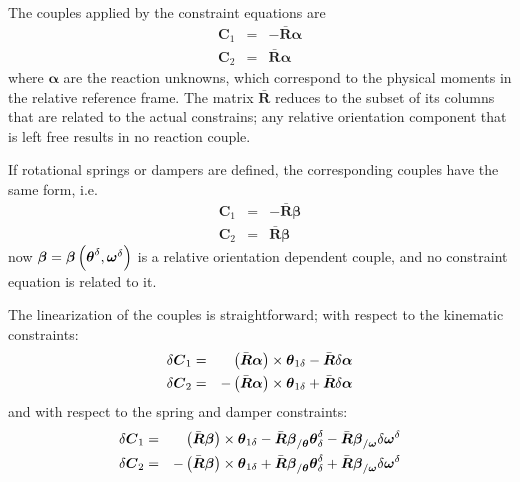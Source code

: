 \documentclass[10pt,dvips,fleqn]{report}
\newcommand{\T}[1]{\boldsymbol{#1}}
\begin{document}
\noindent
The couples applied by the constraint equations are
\begin{eqnarray*}
	\T{C}_1 & = & - \bar{\T{R}} \T{\alpha} \\
	\T{C}_2 & = & \bar{\T{R}} \T{\alpha}
\end{eqnarray*}
where $\T{\alpha}$ are the reaction unknowns, which correspond 
to the physical moments in the relative reference frame.
The matrix $\bar{\T{R}}$ reduces to the subset of its columns 
that are related to the actual constrains; any relative orientation 
component that is left free results in no reaction couple.

\noindent
If rotational springs or dampers are defined, the corresponding
couples have the same form, i.e.\
\begin{eqnarray*}
	\T{C}_1 & = & - \bar{\T{R}} \T{\beta} \\
	\T{C}_2 & = & \bar{\T{R}} \T{\beta}
\end{eqnarray*}
now $\T{\beta}=\T{\beta}\plbr{\T{\theta}^{\delta},\T{\omega}^{\delta}}$ 
is a relative orientation dependent couple, and no constraint equation
is related to it.

The linearization of the couples is straightforward; with respect
to the kinematic constraints:
\begin{eqnarray*}
	\delta\T{C}_1 & = &
	\plbr{\bar{\T{R}} \T{\alpha}}\times\T{\theta}_{1\delta}
	- \bar{\T{R}} \delta\T{\alpha} \\
	\delta\T{C}_2 & = &
	- \plbr{\bar{\T{R}} \T{\alpha}}\times\T{\theta}_{1\delta}
	+ \bar{\T{R}} \delta\T{\alpha}
\end{eqnarray*}
and with respect to the spring and damper constraints:
\begin{eqnarray*}
	\delta\T{C}_1 & = &
	\plbr{\bar{\T{R}} \T{\beta}}\times\T{\theta}_{1\delta}
	- \bar{\T{R}}\T{\beta}_{/\T{\theta}} \T{\theta}^{\delta}_{\delta}
	- \bar{\T{R}}\T{\beta}_{/\T{\omega}} \delta\T{\omega}^{\delta} \\
	\delta\T{C}_2 & = &
	- \plbr{\bar{\T{R}} \T{\beta}}\times\T{\theta}_{1\delta}
	+ \bar{\T{R}}\T{\beta}_{/\T{\theta}} \T{\theta}^{\delta}_{\delta}
	+ \bar{\T{R}}\T{\beta}_{/\T{\omega}} \delta\T{\omega}^{\delta}
\end{eqnarray*}
\end{document}
